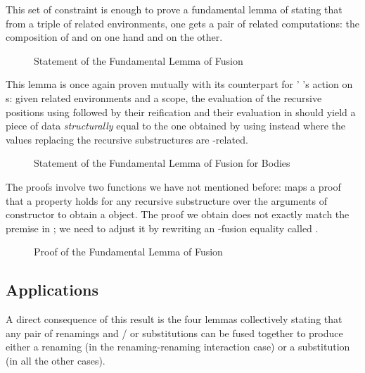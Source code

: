This set of constraint is enough to prove a fundamental lemma
of  stating that from a triple of related environments,
one gets a pair of related computations: the composition of 
and  on one hand and  on the other.

\begin{figure}[h]
\caption{Statement of the Fundamental Lemma of Fusion\label{fig:fusiontype}}
\end{figure}

This lemma is once again proven mutually with its counterpart for '
's action on s: given related environments and a scope, the
evaluation of the recursive positions using  followed by their reification
and their evaluation in  should yield a piece of data \emph{structurally}
equal to the one obtained by using  instead where the values replacing
the recursive substructures are -related.

\begin{figure}[h]
\caption{Statement of the Fundamental Lemma of Fusion for Bodies\label{fig:fusiontype}\label{defn:Fusion}}
\end{figure}

The proofs involve two functions we have not mentioned before:
 maps a proof that a property holds for any recursive substructure
over the arguments of constructor to obtain a  object. The proof
we obtain does not exactly match the premise in ; we need to
adjust it by rewriting an -fusion equality called .

\begin{figure}[h]
\caption{Proof of the Fundamental Lemma of Fusion}
\end{figure}

\subsection{Applications}

A direct consequence of this result is the four lemmas collectively stating
that any pair of renamings and / or substitutions can be fused together to
produce either a renaming (in the renaming-renaming interaction case) or a
substitution (in all the other cases).

